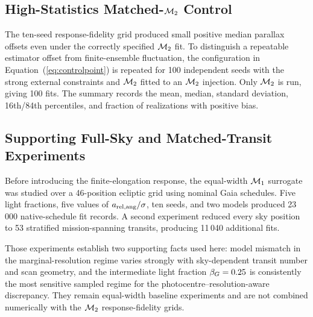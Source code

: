 \subsection{High-Statistics Matched-$\mathcal{M}_2$ Control}

The ten-seed response-fidelity grid produced small positive median parallax offsets even under the correctly specified $\mathcal{M}_2$ fit. To distinguish a repeatable estimator offset from finite-ensemble fluctuation, the configuration in Equation~(\ref{eq:controlpoint}) is repeated for 100 independent seeds with the strong external constraints and $\mathcal{M}_2$ fitted to an $\mathcal{M}_2$ injection. Only $\mathcal{M}_2$ is run, giving 100 fits. The summary records the mean, median, standard deviation, 16th/84th percentiles, and fraction of realizations with positive bias.

\subsection{Supporting Full-Sky and Matched-Transit Experiments}

Before introducing the finite-elongation response, the equal-width $\mathcal{M}_1$ surrogate was studied over a 46-position ecliptic grid using nominal Gaia schedules. Five light fractions, five values of $a_{\rm rel,ang}/\sigma$, ten seeds, and two models produced 23\,000 native-schedule fit records. A second experiment reduced every sky position to 53 stratified mission-spanning transits, producing 11\,040 additional fits.

Those experiments establish two supporting facts used here: model mismatch in the marginal-resolution regime varies strongly with sky-dependent transit number and scan geometry, and the intermediate light fraction $\beta_G=0.25$ is consistently the most sensitive sampled regime for the photocentre--resolution-aware discrepancy. They remain equal-width baseline experiments and are not combined numerically with the $\mathcal{M}_2$ response-fidelity grids.
